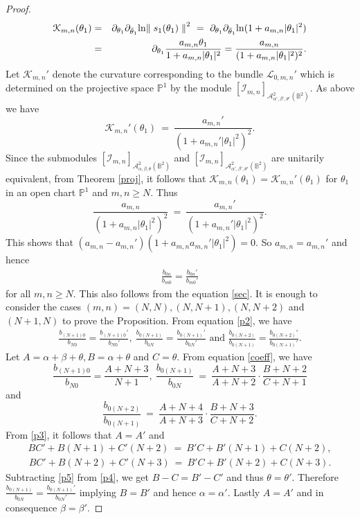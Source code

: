 \documentclass[11pt]{amsart}
\theoremstyle{definition}
\numberwithin{equation}{section}
\begin{document}
\begin{proof}
\begin{eqnarray*} 
{\mathcal K}_{m,n}(\theta_1) &=&\partial_{\theta_1}\partial_{\bar\theta_1} {\rm
ln}{\parallel s_1(\theta_1)\parallel}^2 ~=~
\partial_{\theta_1}\partial_{\bar\theta_1} {\rm
ln}(1+a_{m,n}|\theta_1|^2)\\&=&\partial_{\theta_1}\frac{a_{m,n}\theta_1}{1+a_{m,n}|\theta_1|^2}
= \frac{a_{m,n}}{(1+a_{m,n}|\theta_1|^2)^2}.
\end{eqnarray*} 
Let $\mathcal K_{m,n}'$ denote the curvature corresponding
to the bundle $\mathcal L_{0,m,n}'$ which is determined on the projective space $\mathbb P^1$ by the module $[\mathcal I_{m,n}]_{{\mathcal A}^2_{\alpha',\beta',\theta'}(\mathbb B^2)}$. As above we have
$$
{\mathcal K}_{m,n}'(\theta_1)~=~\frac{a_{m,n}'}{(1+a_{m,n}'|\theta_1|^2)^2}.
$$
Since the submodules $[\mathcal I_{m,n}]_{{\mathcal A}^2_{\alpha,\beta,\theta}(\mathbb B^2)}$  and $[\mathcal I_{m,n}]_ {{\mathcal A}^2_{\alpha',\beta',\theta'}(\mathbb B^2)}$  are unitarily equivalent, from Theorem \ref{proj}, it follows that $\mathcal K_{m,n}(\theta_1)={\mathcal K}_{m,n}'(\theta_1)$ for  $\theta_1$ in an open chart $\mathbb P^1$ and $m,n\geq N$. Thus
$$
\frac{a_{m,n}}{(1+a_{m,n}|\theta_1|^2)^2}~=~\frac{a_{m,n}'}{(1+a_{m,n}'|\theta_1|^2)^2}.
$$ This shows that $(a_{m,n} - a_{m,n}')(1+a_{m,n}a_{m,n}'|\theta_1|^2) = 0$. So $a_{m,n} = a_{m,n}'$ and hence 
\begin{eqnarray}\label{p2}
\frac{b_{0n}}{b_{m0}} = \frac{b_{0n}'}{b_{m0}'}
\end{eqnarray}
for all $m,n\geq N$. This also follows from the equation \eqref{sec}. It is enough to consider the cases $(m,n) = (N,N), (N,N+1), (N,N+2)$ and $ (N+1, N)$ to prove the Proposition.  From equation \eqref{p2}, we have 
\begin{eqnarray}\label{p3}
\frac{b_{(N+1)0}}{b_{N0}}=\frac{b_{(N+1)0}'}{b_{N0}'},~ \frac{b_{0(N+1)}}{b_{0N}}=\frac{b_{0(N+1)}'}{b_{0N}'} \mbox{~and~} \frac{b_{0(N+2)}}{b_{0(N+1)}}=\frac{b_{0(N+2)}'}{b_{0(N+1)}'}.
\end{eqnarray} Let $A=\alpha+\beta+\theta, B=\alpha+\theta$ and $C=\theta$. From equation \eqref{coeff}, we have 
$$
\frac{b_{(N+1)0}}{b_{N0}} = \frac{A+N+3}{N+1},~   \frac{b_{0(N+1)}}{b_{0N}}~=~\frac{A+N+3}{A+N+2}\cdot\frac{B+N+2}{C+N+1}
$$ 
and
$$
\frac{b_{0(N+2)}}{b_{0(N+1)}}~=~\frac{A+N+4}{A+N+3}\cdot\frac{B+N+3}{C+N+2}.
$$ 
From \eqref{p3}, it follows that $A=A'$ and 
\begin{eqnarray}\label{p4}
BC'+B(N+1)+ C'(N+2) ~=~B'C+B'(N+1)+ C(N+2) ,
\end{eqnarray}
\begin{eqnarray}\label{p5}
BC'+B(N+2)+ C'(N+3) ~=~B'C+B'(N+2)+ C(N+3) .
\end{eqnarray}
Subtracting
\eqref{p5} from \eqref{p4}, we get
$B - C= B'- C'$ and thus $\theta = \theta'$. Therefore $\frac{b_{0(N+1)}}{b_{0N}}=\frac{b_{0(N+1)}'}{b_{0N}'}$ implying  $B=B'$ and hence $\alpha = \alpha'$.
Lastly $A=A'$ and in consequence $\beta =\beta'$.\end{proof}
\end{document}

